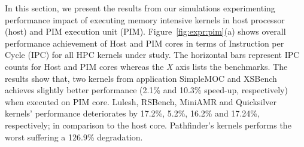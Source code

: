 In this section, we present the results from our simulations experimenting performance impact of executing memory intensive kernels in host processor (host) and PIM execution unit (PIM). Figure~\ref{fig:expr:pim}(a) shows overall performance achievement of Host and PIM cores in terms of Instruction per Cycle (IPC) for all HPC kernels under study. The horizontal bars represent IPC counts for Host and PIM cores whereas the \textit{X} axis lists the benchmarks. The results show that, two kernels from application SimpleMOC and XSBench achieves slightly better performance (2.1\% and 10.3\% speed-up, respectively) when executed on PIM core. Lulesh, RSBench, MiniAMR and Quicksilver kernels' performance deteriorates by 17.2\%, 5.2\%, 16.2\% and 17.24\%, respectively; in comparison to the host core.  Pathfinder's kernels performs the worst suffering a 126.9\% degradation.     


